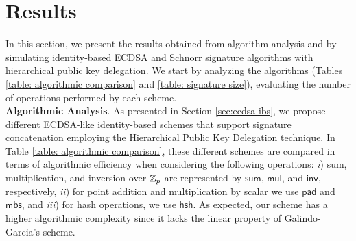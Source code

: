 \documentclass[version=submission, floatrow]{iacrcc}
\begin{document}
\section{Results}\label{sec:results}

In this section, we present the results obtained from algorithm analysis and by simulating identity-based ECDSA and Schnorr signature algorithms with hierarchical public key delegation. We start by analyzing the algorithms (Tables \ref{table: algorithmic comparison} and \ref{table: signature size}), evaluating the number of operations performed by each scheme.\\

\noindent\textbf{Algorithmic Analysis}. As presented in Section \ref{sec:ecdsa-ibs}, we propose different ECDSA-like identity-based schemes that support signature concatenation employing the Hierarchical Public Key Delegation technique. In Table \ref{table: algorithmic comparison}, these different schemes are compared in terms of algorithmic efficiency when considering the following operations: \emph{i}) sum, multiplication, and inversion over $\mathbb{Z}_{p}$ are represented by $\mathsf{sum}$, $\mathsf{mul}$, and $\mathsf{inv}$, respectively, \emph{ii}) for \underline{p}oint \underline{ad}dition and \underline{m}ultiplication \underline{b}y \underline{s}calar we use $\mathsf{pad}$ and $\mathsf{mbs}$, and \emph{iii}) for hash operations, we use $\mathsf{hsh}$. As expected, our scheme has a higher algorithmic complexity since it lacks the linear property of Galindo-Garcia's scheme.
\end{document}
